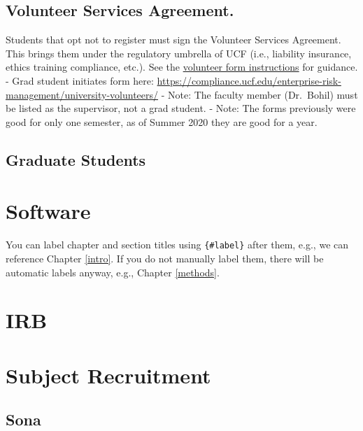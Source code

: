 \documentclass[
]{book}
\begin{document}
\hypertarget{volunteer-services-agreement.}{%
\subsection{Volunteer Services Agreement.}\label{volunteer-services-agreement.}}

Students that opt not to register must sign the Volunteer Services Agreement. This brings them under the regulatory umbrella of UCF (i.e., liability insurance, ethics training compliance, etc.). See the \href{docs/resources/VolunteerFormInstructions.pdf}{volunteer form instructions} for guidance.
- Grad student initiates form here: \url{https://compliance.ucf.edu/enterprise-risk-management/university-volunteers/}
- Note: The faculty member (Dr.~Bohil) must be listed as the supervisor, not a grad student.
- Note: The forms previously were good for only one semester, as of Summer 2020 they are good for a year.

\hypertarget{graduate-students}{%
\subsection{Graduate Students}\label{graduate-students}}

\hypertarget{software}{%
\section{Software}\label{software}}

You can label chapter and section titles using \texttt{\{\#label\}} after them, e.g., we can reference Chapter \ref{intro}. If you do not manually label them, there will be automatic labels anyway, e.g., Chapter \ref{methods}.

\hypertarget{irb}{%
\section{IRB}\label{irb}}

\hypertarget{subject-recruitment}{%
\section{Subject Recruitment}\label{subject-recruitment}}

\hypertarget{sona}{%
\subsection{Sona}\label{sona}}
\end{document}
